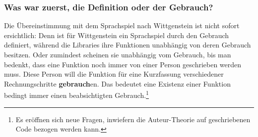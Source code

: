 \documentclass[a4paper,10pt]{article}
\begin{document}
\subsubsection{Was war zuerst, die Definition oder der Gebrauch?}
Die Übereinstimmung mit dem Sprachspiel nach Wittgenstein ist nicht sofort ersichtlich: Denn ist für Wittgenstein ein Sprachspiel durch den Gebrauch definiert, während die Libraries ihre Funktionen unabhängig von deren Gebrauch besitzen. Oder zumindest scheinen sie unabhängig vom Gebrauch, bis man bedenkt, dass eine Funktion noch immer von einer Person geschrieben werden muss. Diese Person will die Funktion für eine Kurzfassung verschiedener Rechnungschritte \textbf{gebrauch}en. Das bedeutet eine Existenz einer Funktion bedingt immer einen beabsichtigten Gebrauch.\footnote{Es eröffnen sich neue Fragen, inwiefern die Auteur-Theorie auf geschriebenen Code bezogen werden kann.} \\
\end{document}

